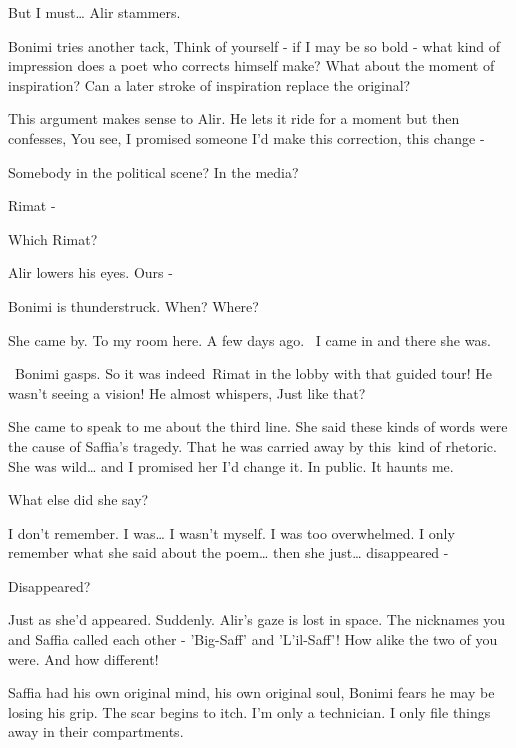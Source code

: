 \documentclass[letterpaper]{article}
\begin{document}
{\textquotedbl}But I must{\dots}{\textquotedbl} Alir stammers. 

Bonimi tries another tack, {\textquotedbl}Think of yourself - if I may be so bold - what kind of impression does a poet
who corrects himself make? What about the moment of inspiration? Can a later stroke of inspiration replace the
original?{\textquotedbl} 

This argument makes sense to Alir. He lets it ride for a moment but then confesses, {\textquotedbl}You see, I promised
someone I'd make this correction, this change -{\textquotedbl} 

{\textquotedbl}Somebody in the political scene? In the media?{\textquotedbl} 

{\textquotedbl}Rimat -{\textquotedbl} 

{\textquotedbl}Which Rimat?{\textquotedbl} 

Alir lowers his eyes. {\textquotedbl}Ours -{\textquotedbl} 

Bonimi is thunderstruck. {\textquotedbl}When? Where?{\textquotedbl}

{\textquotedbl}She came by. To my room here. A few days ago. ~I came in and there she was.{\textquotedbl}

~Bonimi gasps. So it was indeed~Rimat in the lobby with that guided tour! He wasn't seeing a vision! He almost whispers,
{\textquotedbl}Just like that?{\textquotedbl} 

{\textquotedbl}She came to speak to me about the third line. She said these kinds of words were the cause of Saffia's
tragedy. That he was carried away by this~kind of\textcolor{red}{ }rhetoric. She was wild{\dots} and I promised her I'd
change it. In public. It haunts me.{\textquotedbl} 

{\textquotedbl}What else did she say?{\textquotedbl} 

{\textquotedbl}I don't remember. I was{\dots} I wasn't myself. I was too overwhelmed. I only remember what she said
about the poem{\dots} then she just{\dots} disappeared -{\textquotedbl} 

{\textquotedbl}Disappeared?{\textquotedbl} 

{\textquotedbl}Just as she'd appeared. Suddenly.{\textquotedbl} Alir's gaze is lost in space. {\textquotedbl}The
nicknames you and Saffia called each other - 'Big-Saff' and 'L'il-Saff'! How alike the two of you were. And how
different!{\textquotedbl} 

{\textquotedbl}Saffia had his own original mind, his own original soul,{\textquotedbl} Bonimi fears he may be losing his
grip. The scar begins to itch. {\textquotedbl}I'm only a technician. I only file things away in their
compartments.{\textquotedbl}
\end{document}

